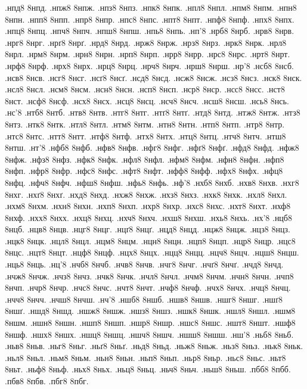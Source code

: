 {.нпд8
8нпд.
.нпж8
8нпж.
.нпз8
8нпз.
.нпк8
8нпк.
.нпл8
8нпл.
.нпм8
8нпм.
.нпн8
8нпн.
.нпп8
8нпп.
.нпр8
8нпр.
.нпс8
8нпс.
.нпт8
8нпт.
.нпф8
8нпф.
.нпх8
8нпх.
.нпц8
8нпц.
.нпч8
8нпч.
.нпш8
8нпш.
.нпь8
8нпь.
.нп'8
.нрб8
8нрб.
.нрв8
8нрв.
.нрг8
8нрг.
.нрґ8
8нрґ.
.нрд8
8нрд.
.нрж8
8нрж.
.нрз8
8нрз.
.нрк8
8нрк.
.нрл8
8нрл.
.нрм8
8нрм.
.нрн8
8нрн.
.нрп8
8нрп.
.нрр8
8нрр.
.нрс8
8нрс.
.нрт8
8нрт.
.нрф8
8нрф.
.нрх8
8нрх.
.нрц8
8нрц.
.нрч8
8нрч.
.нрш8
8нрш.
.нр'8
.нсб8
8нсб.
.нсв8
8нсв.
.нсг8
8нсг.
.нсґ8
8нсґ.
.нсд8
8нсд.
.нсж8
8нсж.
.нсз8
8нсз.
.нск8
8нск.
.нсл8
8нсл.
.нсм8
8нсм.
.нсн8
8нсн.
.нсп8
8нсп.
.нср8
8нср.
.нсс8
8нсс.
.нст8
8нст.
.нсф8
8нсф.
.нсх8
8нсх.
.нсц8
8нсц.
.нсч8
8нсч.
.нсш8
8нсш.
.нсь8
8нсь.
.нс'8
.нтб8
8нтб.
.нтв8
8нтв.
.нтг8
8нтг.
.нтґ8
8нтґ.
.нтд8
8нтд.
.нтж8
8нтж.
.нтз8
8нтз.
.нтк8
8нтк.
.нтл8
8нтл.
.нтм8
8нтм.
.нтн8
8нтн.
.нтп8
8нтп.
.нтр8
8нтр.
.нтс8
8нтс.
.нтт8
8нтт.
.нтф8
8нтф.
.нтх8
8нтх.
.нтц8
8нтц.
.нтч8
8нтч.
.нтш8
8нтш.
.нт'8
.нфб8
8нфб.
.нфв8
8нфв.
.нфг8
8нфг.
.нфґ8
8нфґ.
.нфд8
8нфд.
.нфж8
8нфж.
.нфз8
8нфз.
.нфк8
8нфк.
.нфл8
8нфл.
.нфм8
8нфм.
.нфн8
8нфн.
.нфп8
8нфп.
.нфр8
8нфр.
.нфс8
8нфс.
.нфт8
8нфт.
.нфф8
8нфф.
.нфх8
8нфх.
.нфц8
8нфц.
.нфч8
8нфч.
.нфш8
8нфш.
.нфь8
8нфь.
.нф'8
.нхб8
8нхб.
.нхв8
8нхв.
.нхг8
8нхг.
.нхґ8
8нхґ.
.нхд8
8нхд.
.нхж8
8нхж.
.нхз8
8нхз.
.нхк8
8нхк.
.нхл8
8нхл.
.нхм8
8нхм.
.нхн8
8нхн.
.нхп8
8нхп.
.нхр8
8нхр.
.нхс8
8нхс.
.нхт8
8нхт.
.нхф8
8нхф.
.нхх8
8нхх.
.нхц8
8нхц.
.нхч8
8нхч.
.нхш8
8нхш.
.нхь8
8нхь.
.нх'8
.нцб8
8нцб.
.нцв8
8нцв.
.нцг8
8нцг.
.нцґ8
8нцґ.
.нцд8
8нцд.
.нцж8
8нцж.
.нцз8
8нцз.
.нцк8
8нцк.
.нцл8
8нцл.
.нцм8
8нцм.
.нцн8
8нцн.
.нцп8
8нцп.
.нцр8
8нцр.
.нцс8
8нцс.
.нцт8
8нцт.
.нцф8
8нцф.
.нцх8
8нцх.
.нцц8
8нцц.
.нцч8
8нцч.
.нцш8
8нцш.
.нць8
8нць.
.нц'8
.нчб8
8нчб.
.нчв8
8нчв.
.нчг8
8нчг.
.нчґ8
8нчґ.
.нчд8
8нчд.
.нчж8
8нчж.
.нчз8
8нчз.
.нчк8
8нчк.
.нчл8
8нчл.
.нчм8
8нчм.
.нчн8
8нчн.
.нчп8
8нчп.
.нчр8
8нчр.
.нчс8
8нчс.
.нчт8
8нчт.
.нчф8
8нчф.
.нчх8
8нчх.
.нчц8
8нчц.
.нчч8
8нчч.
.нчш8
8нчш.
.нч'8
.ншб8
8ншб.
.ншв8
8ншв.
.ншг8
8ншг.
.ншґ8
8ншґ.
.ншд8
8ншд.
.ншж8
8ншж.
.ншз8
8ншз.
.ншк8
8ншк.
.ншл8
8ншл.
.ншм8
8ншм.
.ншн8
8ншн.
.ншп8
8ншп.
.ншр8
8ншр.
.ншс8
8ншс.
.ншт8
8ншт.
.ншф8
8ншф.
.ншх8
8ншх.
.ншц8
8ншц.
.ншч8
8ншч.
.ншш8
8ншш.
.нш'8
.ньб8
8ньб.
.ньв8
8ньв.
.ньг8
8ньг.
.ньґ8
8ньґ.
.ньд8
8ньд.
.ньж8
8ньж.
.ньз8
8ньз.
.ньк8
8ньк.
.ньл8
8ньл.
.ньм8
8ньм.
.ньн8
8ньн.
.ньп8
8ньп.
.ньр8
8ньр.
.ньс8
8ньс.
.ньт8
8ньт.
.ньф8
8ньф.
.ньх8
8ньх.
.ньц8
8ньц.
.ньч8
8ньч.
.ньш8
8ньш.
.пбб8
8пбб.
.пбв8
8пбв.
.пбг8
8пбг.
}
